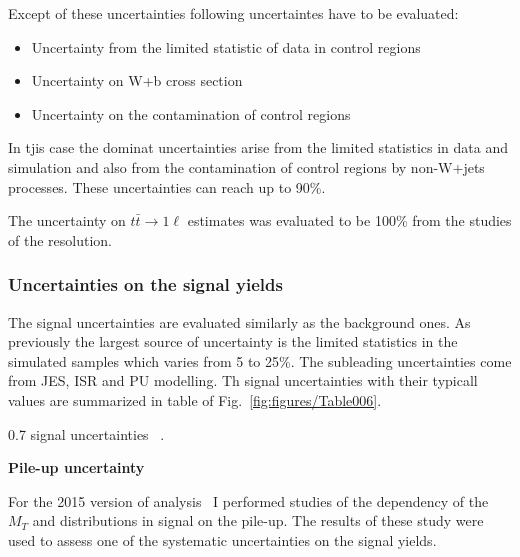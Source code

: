 Except of these uncertainties following uncertaintes have to be evaluated:

\begin{itemize} 
\item Uncertainty from the limited statistic of data in control regions
\item Uncertainty on W+b cross section
\item Uncertainty on the contamination of control regions
\end{itemize}

In tjis case the dominat uncertainties arise from the limited statistics in data and simulation and also from the contamination of control regions by non-W+jets processes. These uncertainties can reach up to 90\%.

The uncertainty on $t\bar{t} \to 1\ell$ estimates was evaluated to be 100\% from the studies of the \MET resolution.

\subsubsection{Uncertainties on the signal yields}

The signal uncertainties are evaluated similarly as the background ones.  As previously the largest source of uncertainty is the limited statistics in the simulated samples which varies from 5 to 25\%. The subleading uncertainties come from JES, ISR and PU modelling. Th signal uncertainties with their typicall values are summarized in table of Fig.~\ref{fig:figures/Table006}.

                 {0.7}       %
                 { signal uncertainties ~\cite{Sirunyan:2017xse}. }

\textbf{Pile-up uncertainty}

For the 2015 version of analysis~\cite{Sirunyan:2016jpr} I performed studies of the dependency of the $M_{T}$ and \MET distributions in signal on the pile-up. The results of these study were used to assess one of the systematic uncertainties on the signal yields.

